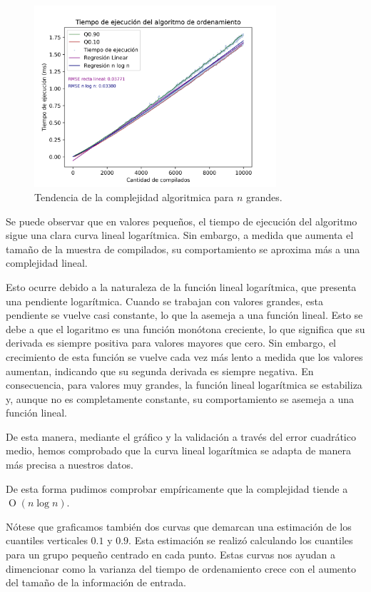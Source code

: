 \begin{figure}[H]
    \centering
    \includegraphics[width=0.8\textwidth]{img/tiempos_valores_altos_puntos.png}
    \caption{Tendencia de la complejidad algoritmica para $n$ grandes.}
    \label{fig:tiempos_valores_altos_puntos}
\end{figure}

Se puede observar que en valores pequeños, el tiempo de ejecución del algoritmo sigue una clara curva lineal logarítmica. Sin embargo, a medida
que aumenta el tamaño de la muestra de compilados, su comportamiento se aproxima más a una complejidad lineal.

Esto ocurre debido a la naturaleza de la función lineal logarítmica, que presenta una pendiente logarítmica. Cuando se 
trabajan con valores grandes, esta pendiente se vuelve casi constante, lo que la asemeja a una función lineal. Esto se 
debe a que el logaritmo es una función monótona creciente, lo que significa que su derivada es siempre positiva para valores 
mayores que cero. Sin embargo, el crecimiento de esta función se vuelve cada vez más lento a medida que los valores aumentan, 
indicando que su segunda derivada es siempre negativa. En consecuencia, para valores muy grandes, la función lineal logarítmica 
se estabiliza y, aunque no es completamente constante, su comportamiento se asemeja a una función lineal.

De esta manera, mediante el gráfico y la validación a través del error cuadrático medio, hemos comprobado que la curva lineal logarítmica 
se adapta de manera más precisa a nuestros datos.

De esta forma pudimos comprobar empíricamente que la complejidad tiende a $\operatorname{O}(n\log{n})$.

Nótese que graficamos también dos curvas que demarcan una estimación de los cuantiles verticales $0.1$ y $0.9$. Esta estimación
se realizó calculando los cuantiles para un grupo pequeño centrado en cada punto. Estas curvas nos ayudan a dimencionar como la
varianza del tiempo de ordenamiento crece con el aumento del tamaño de la información de entrada.

